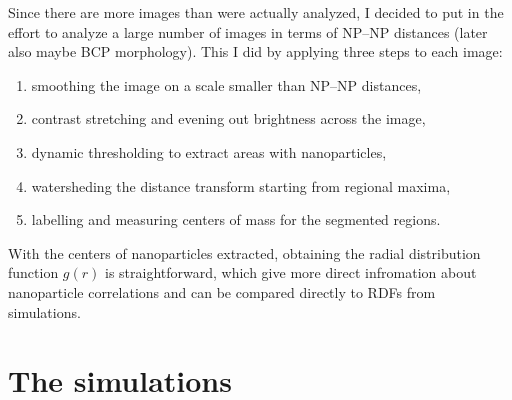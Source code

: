 Since there are more images than were actually analyzed, I decided to put in the effort to analyze a large number of images in terms of NP--NP distances (later also maybe BCP morphology). This I did by applying three steps to each image:
\begin{enumerate}
\setlength{\itemsep}{-2pt}
\item smoothing the image on a scale smaller than NP--NP distances,
\item contrast stretching and evening out brightness across the image,
\item dynamic thresholding to extract areas with nanoparticles,
\item watersheding the distance transform starting from regional maxima,
\item labelling and measuring centers of mass for the segmented regions.
\end{enumerate}

With the centers of nanoparticles extracted, obtaining the radial distribution function $g(r)$ is straightforward, which give more direct infromation about nanoparticle correlations and can be compared directly to RDFs from simulations.

\section{The simulations}

